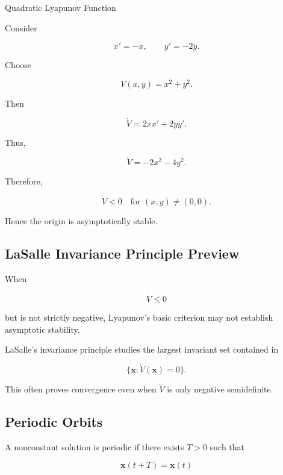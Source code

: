 \begin{workedexamplebox}{Quadratic Lyapunov Function}

Consider

\[
x'=-x,
\qquad
y'=-2y.
\]

Choose

\[
V(x,y)
=
x^2+y^2.
\]

Then

\[
\dot V
=
2xx'
+
2yy'.
\]

Thus,

\[
\dot V
=
-2x^2
-
4y^2.
\]

Therefore,

\begin{answerbox}
\[
\boxed{
\dot V<0
\quad
\text{for }
(x,y)\neq(0,0).
}
\]

Hence the origin is asymptotically stable.
\end{answerbox}

\end{workedexamplebox}

\subsection{LaSalle Invariance Principle Preview}
\label{subsec:lasalle-preview}

When

\[
\dot V\leq0
\]

but is not strictly negative, Lyapunov's basic criterion may not establish
asymptotic stability.

LaSalle's invariance principle studies the largest invariant set
contained in

\[
\boxed{
\{
\mathbf{x}:
\dot V(\mathbf{x})=0
\}.
}
\]

This often proves convergence even when \(\dot V\) is only negative
semidefinite.

\subsection{Periodic Orbits}
\label{subsec:periodic-orbits}

A nonconstant solution is periodic if there exists \(T>0\) such that

\[
\boxed{
\mathbf{x}(t+T)
=
\mathbf{x}(t)
}
\]

